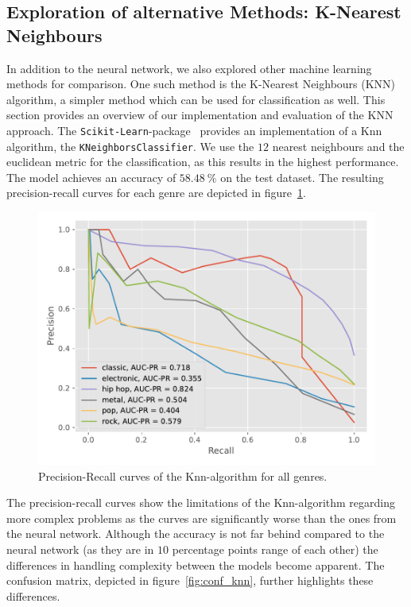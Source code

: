 \documentclass[
  12pt,
  bibliography=totoc,     %
  captions=tableheading,  %
  titlepage=firstiscover, %
]{scrartcl}
\begin{document}
\subsection{Exploration of alternative Methods: K-Nearest Neighbours}
In addition to the neural network, we also explored other machine learning methods for comparison. One such method is the K-Nearest Neighbours (KNN) algorithm, a simpler
method which can be used for classification as well. This section provides an overview of our implementation and evaluation of the KNN approach.
The \texttt{Scikit-Learn}-package~\cite{scikit-learn} provides an implementation of a Knn algorithm, the \texttt{KNeighborsClassifier}.
We use the $12$ nearest neighbours and the euclidean metric for the classification, as this results in the highest performance. The model achieves an accuracy of $\SI{58.48}{\percent}$ on the test
dataset.
The resulting precision-recall curves for each genre are depicted in figure~\ref{fig:pr_knn}.
\begin{figure}[H]
  \centering
  \includegraphics[scale=0.7]{figures/knn/PR_KNN.pdf}
  \caption{Precision-Recall curves of the Knn-algorithm for all genres.}
  \label{fig:pr_knn}
\end{figure}
\noindent
The precision-recall curves show the limitations of the Knn-algorithm regarding more complex problems as the curves are significantly worse than the ones
from the neural network. Although the accuracy is not far behind compared to the neural network (as they are in $\num{10}$ percentage points range of each other) the
differences in handling complexity between the models become apparent.
The confusion matrix, depicted in figure~\ref{fig:conf_knn}, further highlights these differences.
\end{document}

